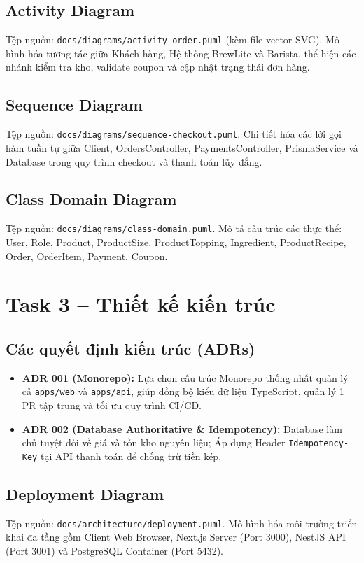 \documentclass[a4paper]{article}
\begin{document}
\subsection{Activity Diagram}
Tệp nguồn: \texttt{docs/diagrams/activity-order.puml} (kèm file vector SVG). Mô hình hóa tương tác giữa Khách hàng, Hệ thống BrewLite và Barista, thể hiện các nhánh kiểm tra kho, validate coupon và cập nhật trạng thái đơn hàng.

\subsection{Sequence Diagram}
Tệp nguồn: \texttt{docs/diagrams/sequence-checkout.puml}. Chi tiết hóa các lời gọi hàm tuần tự giữa Client, OrdersController, PaymentsController, PrismaService và Database trong quy trình checkout và thanh toán lũy đẳng.

\subsection{Class Domain Diagram}
Tệp nguồn: \texttt{docs/diagrams/class-domain.puml}. Mô tả cấu trúc các thực thể: User, Role, Product, ProductSize, ProductTopping, Ingredient, ProductRecipe, Order, OrderItem, Payment, Coupon.

\section{Task 3 – Thiết kế kiến trúc}
\subsection{Các quyết định kiến trúc (ADRs)}
\begin{itemize}
    \item \textbf{ADR 001 (Monorepo):} Lựa chọn cấu trúc Monorepo thống nhất quản lý cả \texttt{apps/web} và \texttt{apps/api}, giúp đồng bộ kiểu dữ liệu TypeScript, quản lý 1 PR tập trung và tối ưu quy trình CI/CD.
    \item \textbf{ADR 002 (Database Authoritative \& Idempotency):} Database làm chủ tuyệt đối về giá và tồn kho nguyên liệu; Áp dụng Header \texttt{Idempotency-Key} tại API thanh toán để chống trừ tiền kép.
\end{itemize}

\subsection{Deployment Diagram}
Tệp nguồn: \texttt{docs/architecture/deployment.puml}. Mô hình hóa môi trường triển khai đa tầng gồm Client Web Browser, Next.js Server (Port 3000), NestJS API (Port 3001) và PostgreSQL Container (Port 5432).
\end{document}

